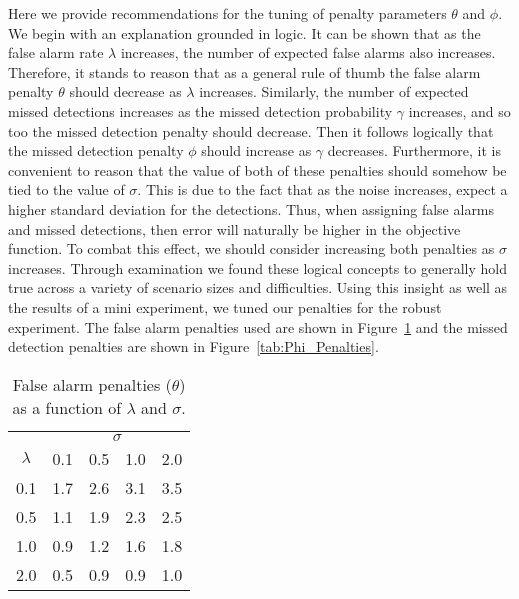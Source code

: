 Here we provide recommendations for the tuning of penalty parameters $\theta$ and $\phi$. We begin with an explanation grounded in logic. It can be shown that as the false alarm rate $\lambda$ increases, the number of expected false alarms also increases. Therefore, it stands to reason that as a general rule of thumb the false alarm penalty $\theta$ should decrease as $\lambda$ increases. Similarly, the number of expected missed detections increases as the missed detection probability $\gamma$ increases, and so too the missed detection penalty should decrease. Then it follows logically that the missed detection penalty $\phi$ should increase as $\gamma$ decreases. Furthermore, it is convenient to reason that the value of both of these penalties should somehow be tied to the value of $\sigma$. This is due to the fact that as the noise increases, expect a higher standard deviation for the detections. 
Thus, when assigning false alarms and missed detections, then error will naturally be higher in the objective function. To combat this effect, we should consider increasing both penalties as $\sigma$ increases. Through examination we found these logical concepts to generally hold true across a variety of scenario sizes and difficulties. Using this insight as well as the results of a mini experiment, we tuned our penalties for the robust experiment. The false alarm penalties used are shown in Figure~\ref{tab:Theta_Penalties} and the missed detection penalties are shown in Figure~\ref{tab:Phi_Penalties}.
\begin{table}[ht]
\centering
\begin{tabular}{c|m{1cm}m{1cm}m{1cm}m{1cm}}
  \hline
   & \multicolumn{4}{c}{$\sigma$} \\
   \cline{2-5}
   $\lambda$ & 0.1 & 0.5 & 1.0 & 2.0\\
  \hline 
   0.1 & 1.7 & 2.6 & 3.1 & 3.5 \\
   0.5 & 1.1 & 1.9 & 2.3 & 2.5 \\ 
   1.0 & 0.9 & 1.2 & 1.6 & 1.8 \\ 
   2.0 & 0.5 & 0.9 & 0.9 & 1.0 \\ 
   \hline
\end{tabular}
\caption{False alarm penalties ($\theta$) as a function of $\lambda$ and $\sigma$.}
\label{tab:Theta_Penalties}
\end{table}
